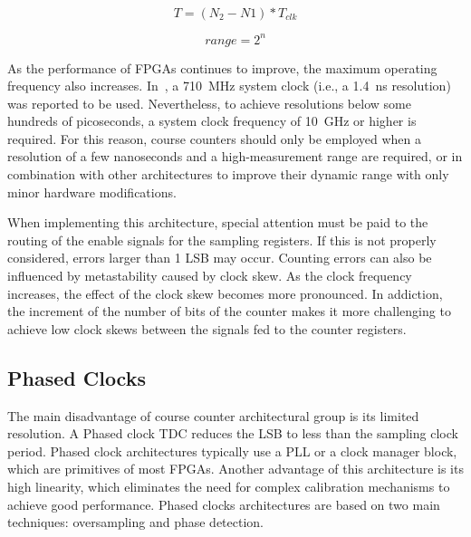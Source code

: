 \begin{equation}
	T = (N_{2}-N{1}) * T_{clk}
	\label{eq:course_conter_measured_time}
\end{equation}

\begin{equation}
	range = 2 ^ n
	\label{eq:course_conter_range}
\end{equation}

As the performance of \glspl{FPGA} continues to improve, the maximum operating frequency also increases. In~\citep{course_counter_710}, a 710~MHz system clock (i.e., a 1.4~ns resolution) was reported to be used. Nevertheless, to achieve resolutions below some hundreds of picoseconds, a system clock frequency of 10~GHz or higher is required. For this reason, course counters should only be employed when a resolution of a few nanoseconds and a high-measurement range are required, or in combination with other architectures to improve their dynamic range with only minor hardware modifications.

When implementing this architecture, special attention must be paid to the routing of the enable signals for the sampling registers. If this is not properly considered, errors larger than 1 \gls{LSB} may occur. Counting errors can also be influenced by metastability caused by clock skew. As the clock frequency increases, the effect of the clock skew becomes more pronounced. In addiction, the increment of the number of bits of the counter makes it more challenging to achieve low clock skews between the signals fed to the counter registers.


\subsection{Phased Clocks} %
\label{sub:phased_clocks}

The main disadvantage of course counter architectural group is its limited resolution. A Phased clock \gls{TDC} reduces the \gls{LSB} to less than the sampling clock period. Phased clock architectures typically use a \gls{PLL} or a clock manager block, which are primitives of most \glspl{FPGA}. Another advantage of this architecture is its high linearity, which eliminates the need for complex calibration mechanisms to achieve good performance. Phased clocks architectures are based on two main techniques: oversampling and phase detection.

